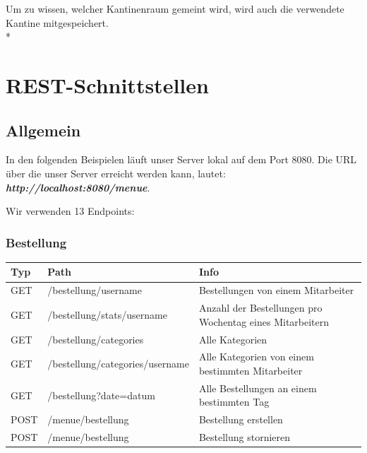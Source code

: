 Um zu wissen, welcher Kantinenraum gemeint wird, wird auch die verwendete Kantine mitgespeichert. \\*

\section{REST-Schnittstellen}



\subsection{Allgemein}

In den folgenden Beispielen läuft unser Server lokal auf dem Port 8080. Die URL über die unser
Server erreicht werden kann, lautet: \textbf{\textit{http://localhost:8080/menue}}.

Wir verwenden 13 Endpoints:

\subsubsection{Bestellung}

\begin{tabular}{|p{3cm}|p{6cm}|p{5cm}|}
    \hline
    Typ & Path & Info\\
    \hline
    GET & /bestellung/{username} & Bestellungen von einem Mitarbeiter\\
    \hline
    GET & /bestellung/stats/{username} & Anzahl der Bestellungen pro Wochentag eines Mitarbeitern\\
    \hline
    GET & /bestellung/categories & Alle Kategorien\\
    \hline
    GET & /bestellung/categories/{username} & Alle Kategorien von einem bestimmten Mitarbeiter\\
    \hline
    GET & /bestellung?date=datum & Alle Bestellungen an einem bestimmten Tag\\
    \hline
    POST & /menue/bestellung & Bestellung erstellen\\
    \hline
    POST & /menue/bestellung & Bestellung stornieren\\
    \hline
\end{tabular}

